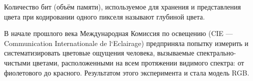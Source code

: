 \begin{figure}[ht!]
\end{figure}

Количество бит (объём памяти), используемое для хранения и представления цвета при кодировании одного пикселя называют глубиной цвета. 

В начале прошлого века Международная Комиссия по освещению (CIE —
Communication Internationale de l`Eclairage) предприняла попытку  измерить и систематизировать цветовые ощущения человека, вызываемые спектрально-чистыми
цветами, расположенными на всем протяжении видимого спектра: от фиолетового до
красного. Результатом этого эксперимента и стала модель RGB. 

\begin{figure}[ht!]
\end{figure}


